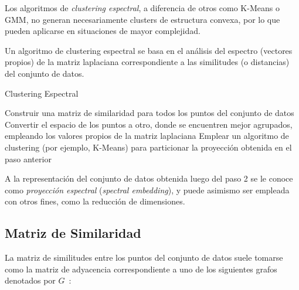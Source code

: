 Los algoritmos de \textit{clustering espectral}, a diferencia de otros como K-Means o GMM, no generan necesariamente clusters de estructura convexa, por lo que pueden aplicarse en situaciones de mayor complejidad.

Un algoritmo de clustering espectral se basa en el análisis del espectro (vectores propios) de la matriz laplaciana correspondiente a las similitudes (o distancias) del conjunto de datos.

\begin{algorithm}
    \caption{Clustering Espectral}
    \label{algorithm:SpectralClustering}
    Construir una matriz de similaridad para todos los puntos del conjunto de datos\;
    Convertir el espacio de los puntos a otro, donde se encuentren mejor agrupados, empleando los valores propios de la matriz laplaciana\;
    Emplear un algoritmo de clustering (por ejemplo, K-Means) para particionar la proyección obtenida en el paso anterior\;
\end{algorithm}

A la representación del conjunto de datos obtenida luego del paso 2 se le conoce como \textit{proyección espectral} (\textit{spectral embedding}), y puede asimismo ser empleada con otros fines, como la reducción de dimensiones.

\subsection{Matriz de Similaridad}\label{subsec:matrizDeSimilaridad}

La matriz de similitudes entre los puntos del conjunto de datos suele tomarse como la matriz de adyacencia correspondiente a uno de los siguientes grafos denotados por $G$~\cite{Aggarawal13}:

